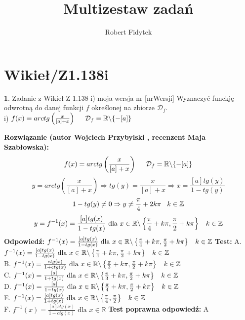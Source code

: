 \documentclass[12pt, a4paper]{article}
\title{Multizestaw zadań}
\author{Robert Fidytek}
\date{}
\theoremstyle{definition} %
\newtheorem{zad}{}
\newcommand{\kategoria}[1]{\section{#1}} %
\newcommand{\zadStart}[1]{\begin{zad}#1\newline} %
\newcommand{\zadStop}{\end{zad}}   %
\newcommand{\rozwStart}[2]{\noindent \textbf{Rozwiązanie (autor #1 , recenzent #2): }\newline} %
\newcommand{\rozwStop}{\newline}                                            %
\newcommand{\odpStart}{\noindent \textbf{Odpowiedź:}\newline}    %
\newcommand{\odpStop}{\newline}                                             %
\newcommand{\testStart}{\noindent \textbf{Test:}\newline} %
\newcommand{\testStop}{\newline} %
\newcommand{\kluczStart}{\noindent \textbf{Test poprawna odpowiedź:}\newline} %
\newcommand{\kluczStop}{\newline} %
\begin{document}
\maketitle


\kategoria{Wikieł/Z1.138i}
\zadStart{Zadanie z Wikieł Z 1.138 i) moja wersja nr [nrWersji]}
Wyznaczyć funckję odwrotną do danej funkcji $f$ określonej na zbiorze $\mathcal{D}_{f}$.\\
i) $f(x)=arctg\left(\frac{x}{[a]+x}\right)\hspace{5mm}\mathcal{D}_{f}=\mathbb{R}\backslash\{-[a]\}$
\zadStop
\rozwStart{Wojciech Przybylski}{Maja Szabłowska}
$$f(x)=arctg\left(\frac{x}{[a]+x}\right)\hspace{5mm} \mathcal{D}_{f}=\mathbb{R}\backslash\{-[a]\}$$
$$y=arctg\left(\frac{x}{[a]+x}\right)\Rightarrow tg(y)=\frac{x}{[a]+x} \Rightarrow x=\frac{[a]tg(y)}{1-tg(y)}$$
$$1-tg(y)\neq0 \Rightarrow y\neq\frac{\pi}{4}+2k\pi\hspace{3mm}k\in\mathbb{Z}$$
$$y=f^{-1}(x)=\frac{[a]tg(x)}{1-tg(x)} \mbox{ dla } x\in \mathbb{R}\backslash\left\{\frac{\pi}{4}+k\pi,\frac{\pi}{2}+k\pi\right\}\hspace{3mm}k\in\mathbb{Z}$$
\rozwStop
\odpStart
$f^{-1}(x)=\frac{[a]tg(x)}{1-tg(x)}  \mbox{ dla }x\in \mathbb{R}\backslash\left\{\frac{\pi}{4}+k\pi,\frac{\pi}{2}+k\pi\right\}\hspace{3mm}k\in\mathbb{Z}$
\odpStop
\testStart
A. $f^{-1}(x)=\frac{[a]tg(x)}{1-tg(x)}   \mbox{ dla }x\in \mathbb{R}\backslash\left\{\frac{\pi}{4}+k\pi,\frac{\pi}{2}+k\pi\right\}\hspace{3mm}k\in\mathbb{Z}$\\
B. $f^{-1}(x)=\frac{ctg(x)}{1+ctg(x)}  \mbox{ dla }x\in \mathbb{R}\backslash\left\{\frac{\pi}{3}+k\pi,\frac{\pi}{2}+k\pi\right\}\hspace{3mm}k\in\mathbb{Z}$\\
C. $f^{-1}(x)=\frac{[a]}{1+tg(x)} \mbox{ dla }x\in \mathbb{R}\backslash\left\{\frac{\pi}{3}+k\pi,\frac{\pi}{2}+k\pi\right\}\hspace{3mm}k\in\mathbb{Z}$\\
D. $f^{-1}(x)=\frac{[a]}{1-tg(x)} \mbox{ dla }x\in \mathbb{R}\backslash\left\{\frac{\pi}{4}+k\pi,\frac{\pi}{2}+k\pi\right\}\hspace{3mm}k\in\mathbb{Z}$\\
E. $f^{-1}(x)=\frac{[a]tg(x)}{1+tg(x)} \mbox{ dla }x\in \mathbb{R}\backslash\left\{\frac{\pi}{4},\frac{\pi}{2}\right\}\hspace{3mm}k\in\mathbb{Z}$\\
F. $f^{-1}(x)=\frac{[a]ctg(x)}{1-ctg(x)} \mbox{ dla }x\in \mathbb{R}$
\testStop
\kluczStart
A
\kluczStop
\end{document}
